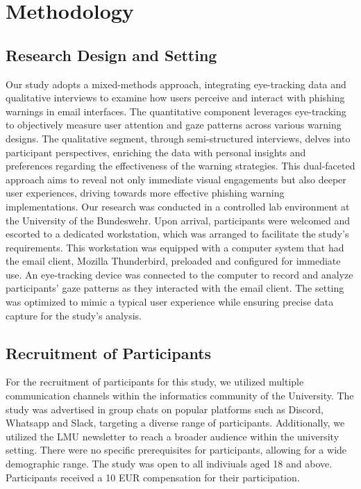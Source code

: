 \documentclass[
  a4paper,  %
  twoside,  %
  bibliography=totoc,
  headsepline,
  cleardoublepage=empty,
  parskip=half,
  draft=false
]{scrbook}
\begin{document}

\chapter{Methodology}
\label{sec:methodology}
\section{Research Design and Setting}
Our study adopts a mixed-methods approach, integrating eye-tracking data and qualitative interviews to examine how users perceive and interact with phishing warnings in email interfaces. The quantitative component leverages eye-tracking to objectively measure user attention and gaze patterns across various warning designs. The qualitative segment, through semi-structured interviews, delves into participant perspectives, enriching the data with personal insights and preferences regarding the effectiveness of the warning strategies. This dual-faceted approach aims to reveal not only immediate visual engagements but also deeper user experiences, driving towards more effective phishing warning implementations. \newline
Our research was conducted in a controlled lab environment at the University of the Bundeswehr. Upon arrival, participants were welcomed and escorted to a dedicated workstation, which was arranged to facilitate the study's requirements. This workstation was equipped with a computer system that had the email client, Mozilla Thunderbird, preloaded and configured for immediate use. An eye-tracking device was connected to the computer to record and analyze participants' gaze patterns as they interacted with the email client. The setting was optimized to mimic a typical user experience while ensuring precise data capture for the study's analysis.

\section{Recruitment of Participants}
For the recruitment of participants for this study, we utilized multiple communication channels within the informatics community of the University. The study was advertised in group chats on popular platforms such as Discord, Whatsapp and Slack, targeting a diverse range of participants. Additionally, we utilized the LMU newsletter to reach a broader audience within the university setting. There were no specific prerequisites for participants, allowing for a wide demographic range. The study was open to all indiviuals aged 18 and above. Participants received a 10 EUR compensation for their participation.
\end{document}
